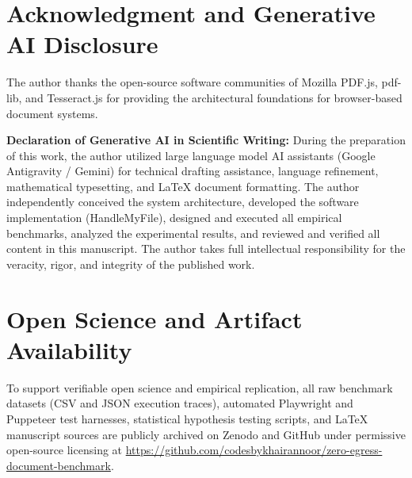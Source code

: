 \documentclass[journal]{IEEEtran}
\begin{document}
\section*{Acknowledgment and Generative AI Disclosure}
The author thanks the open-source software communities of Mozilla PDF.js, pdf-lib, and Tesseract.js for providing the architectural foundations for browser-based document systems.

\noindent\textbf{Declaration of Generative AI in Scientific Writing:} During the preparation of this work, the author utilized large language model AI assistants (Google Antigravity / Gemini) for technical drafting assistance, language refinement, mathematical typesetting, and LaTeX document formatting. The author independently conceived the system architecture, developed the software implementation (HandleMyFile), designed and executed all empirical benchmarks, analyzed the experimental results, and reviewed and verified all content in this manuscript. The author takes full intellectual responsibility for the veracity, rigor, and integrity of the published work.

\section*{Open Science and Artifact Availability}
To support verifiable open science and empirical replication, all raw benchmark datasets (CSV and JSON execution traces), automated Playwright and Puppeteer test harnesses, statistical hypothesis testing scripts, and LaTeX manuscript sources are publicly archived on Zenodo and GitHub under permissive open-source licensing at \url{https://github.com/codesbykhairannoor/zero-egress-document-benchmark}.



\end{document}
